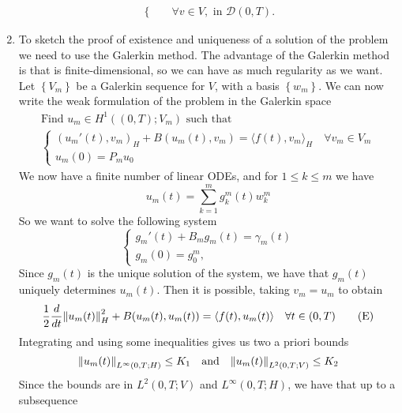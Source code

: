 \begin{enumerate}
\[\begin{split}
\begin{cases}
                  \end{cases}\quad \forall v \in V, \text{ in } \mathcal{D}(0, T).
              \end{split}
          \]
    \item To sketch the proof of existence and uniqueness of a solution of the problem we
          need to use the Galerkin method. The advantage of the Galerkin method is that
          is finite-dimensional, so we can have as much regularity as we want. Let
          \(\left\{V_m\right\}\) be a Galerkin sequence for \(V\), with a basis
          \(\left\{w_m \right\}\). We can now write the weak formulation of the problem
          in the Galerkin space
          \[
              \begin{split}
                  \text{Find } u_m \in H^1((0, T); V_m) \text{ such that } \\
                  \begin{cases}
                      \left(u_m'(t), v_m\right)_H + B(u_m(t), v_m) = \langle f(t), v_m \rangle_H  \quad \forall v_m \in V_m \\
                      u_m(0) = P_m u_0
                  \end{cases}
              \end{split}
          \]
          We now have a finite number of linear ODEs, and for \(1 \leq k \leq m\) we have
          \[
              u_m(t) = \sum_{k=1}^m g_k^m(t) w_k^m
          \]
          So we want to solve the following system
          \[
              \begin{cases}
                  g_m'(t) + B_m g_m(t) = \gamma_m(t) \\
                  g_m(0) = g_0^m,
              \end{cases}
          \]
          Since \(g_m(t)\) is the unique solution of the system, we have that \(g_m(t)\)
          uniquely determines \(u_m(t)\). Then it is possible, taking \(v_m = u_m\) to
          obtain
          \[
              \frac{1}{2}\frac{d}{dt}\norm{u_m(t)}_H^2 + B(u_m(t), u_m(t)) = \langle f(t), u_m(t) \rangle \quad \forall t \in (0, T)
              \tag*{(E)}
          \]
          Integrating and using some inequalities gives us two a priori bounds
          \[
              \norm{u_m(t)}_{L^\infty(0, T; H)} \leq K_1 \quad \text{and} \quad \norm{u_m(t)}_{L^2(0, T; V)} \leq K_2
          \]
          Since the bounds are in \(L^2(0, T; V)\) and \(L^\infty(0, T; H)\), we have
          that up to a subsequence
          \begin{align*}

\end{align*}
\end{enumerate}
